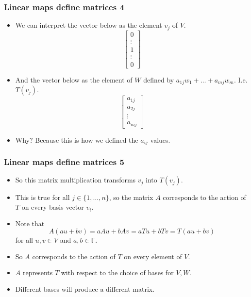 \documentclass[handout]{beamer}
\newcommand{\bF}{\mathbb{F}}
\begin{document}
\begin{frame}
\frametitle{Linear maps define matrices 4}
\begin{itemize}
\item We can interpret the vector below as the element $v_j$ of $V$. 
\[
\begin{bmatrix}
0\\
\vdots\\
1\\
\vdots\\
0
\end{bmatrix}\]
\item And the vector below as the element of $W$ defined by $a_{1j}w_1+\ldots + a_{mj}w_m$. I.e. $T(v_j)$.
\[\begin{bmatrix}
a_{1j}\\
a_{2j}\\
\vdots\\
a_{mj}
\end{bmatrix}
\]

\item Why? Because this is how we defined the $a_{ij}$ values.
\end{itemize}
\end{frame}

\begin{frame}
\frametitle{Linear maps define matrices 5}
\begin{itemize}
\item So this matrix multiplication transforms $v_j$ into $T(v_j)$. \vspace{0.2cm}
\item This is true for all $j\in\{1,\ldots,n\}$, so the matrix $A$ corresponds to the action of $T$ on every basis vector $v_i$. \vspace{0.2cm}
\item Note that \[A(au+bv) = aAu + bAv = aTu + bTv = T(au+bv)\] for all $u,v\in V$ and $a,b\in \bF$.\vspace{0.2cm}
\item So $A$ corresponds to the action of $T$ on every element of $V$. \vspace{0.2cm}
\item $A$ represents $T$ with respect to the choice of bases for $V,W$. \vspace{0.2cm}
\item Different bases will produce a different matrix.
\end{itemize}
\end{frame}
\end{document}
